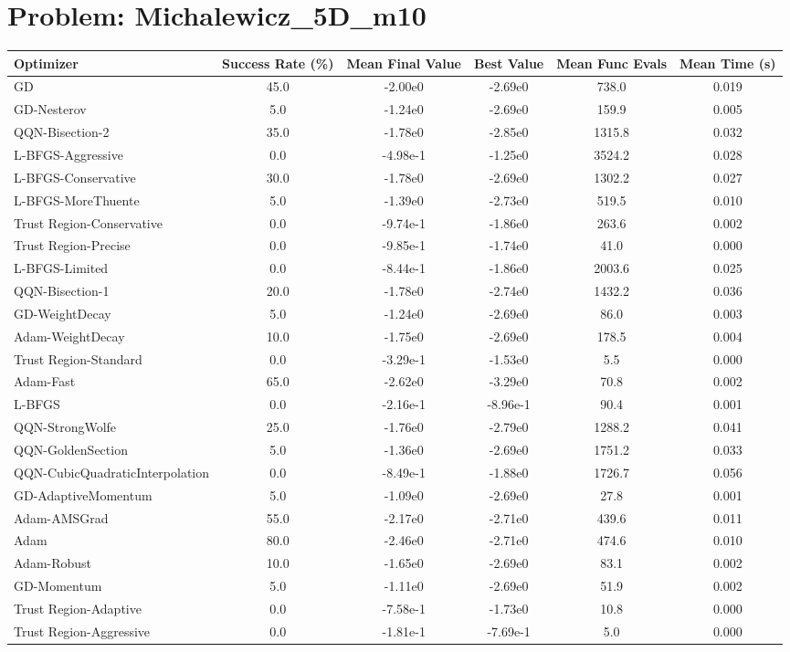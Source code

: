 \documentclass{article}
\begin{document}
\section{Problem: Michalewicz\_5D\_m10}
\begin{longtable}{p{3cm}*{5}{c}}
\toprule
\textbf{Optimizer} & \textbf{Success Rate (\%)} & \textbf{Mean Final Value} & \textbf{Best Value} & \textbf{Mean Func Evals} & \textbf{Mean Time (s)} \\
\midrule
GD & 45.0 & -2.00e0 & -2.69e0 & 738.0 & 0.019 \\
GD-Nesterov & 5.0 & -1.24e0 & -2.69e0 & 159.9 & 0.005 \\
QQN-Bisection-2 & 35.0 & -1.78e0 & -2.85e0 & 1315.8 & 0.032 \\
L-BFGS-Aggressive & 0.0 & -4.98e-1 & -1.25e0 & 3524.2 & 0.028 \\
L-BFGS-Conservative & 30.0 & -1.78e0 & -2.69e0 & 1302.2 & 0.027 \\
L-BFGS-MoreThuente & 5.0 & -1.39e0 & -2.73e0 & 519.5 & 0.010 \\
Trust Region-Conservative & 0.0 & -9.74e-1 & -1.86e0 & 263.6 & 0.002 \\
Trust Region-Precise & 0.0 & -9.85e-1 & -1.74e0 & 41.0 & 0.000 \\
L-BFGS-Limited & 0.0 & -8.44e-1 & -1.86e0 & 2003.6 & 0.025 \\
QQN-Bisection-1 & 20.0 & -1.78e0 & -2.74e0 & 1432.2 & 0.036 \\
GD-WeightDecay & 5.0 & -1.24e0 & -2.69e0 & 86.0 & 0.003 \\
Adam-WeightDecay & 10.0 & -1.75e0 & -2.69e0 & 178.5 & 0.004 \\
Trust Region-Standard & 0.0 & -3.29e-1 & -1.53e0 & 5.5 & 0.000 \\
Adam-Fast & 65.0 & -2.62e0 & -3.29e0 & 70.8 & 0.002 \\
L-BFGS & 0.0 & -2.16e-1 & -8.96e-1 & 90.4 & 0.001 \\
QQN-StrongWolfe & 25.0 & -1.76e0 & -2.79e0 & 1288.2 & 0.041 \\
QQN-GoldenSection & 5.0 & -1.36e0 & -2.69e0 & 1751.2 & 0.033 \\
QQN-CubicQuadraticInterpolation & 0.0 & -8.49e-1 & -1.88e0 & 1726.7 & 0.056 \\
GD-AdaptiveMomentum & 5.0 & -1.09e0 & -2.69e0 & 27.8 & 0.001 \\
Adam-AMSGrad & 55.0 & -2.17e0 & -2.71e0 & 439.6 & 0.011 \\
Adam & 80.0 & -2.46e0 & -2.71e0 & 474.6 & 0.010 \\
Adam-Robust & 10.0 & -1.65e0 & -2.69e0 & 83.1 & 0.002 \\
GD-Momentum & 5.0 & -1.11e0 & -2.69e0 & 51.9 & 0.002 \\
Trust Region-Adaptive & 0.0 & -7.58e-1 & -1.73e0 & 10.8 & 0.000 \\
Trust Region-Aggressive & 0.0 & -1.81e-1 & -7.69e-1 & 5.0 & 0.000 \\
\bottomrule
\end{longtable}
\end{document}
